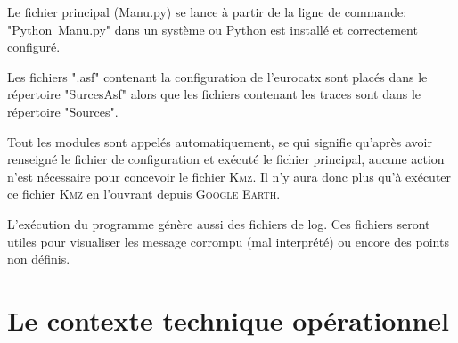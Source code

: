 Le fichier principal (Manu.py) se lance à partir de la ligne de commande: "Python~Manu.py" dans un système ou Python est installé et correctement configuré.

Les fichiers ".asf" contenant la configuration de l’eurocatx sont placés dans le répertoire "SurcesAsf" alors que les fichiers contenant les traces sont dans le répertoire "Sources". 

Tout les modules sont appelés automatiquement, se qui signifie qu'après avoir renseigné le fichier de configuration et exécuté le fichier principal, aucune action n'est nécessaire pour concevoir le fichier \textsc{Kmz}. Il n'y aura donc plus qu'à exécuter ce fichier \textsc{Kmz} en l'ouvrant depuis \textsc{Google Earth}. 

L'exécution du programme génère aussi des fichiers de log. Ces fichiers seront utiles pour visualiser les message corrompu (mal interprété) ou encore des points non définis.

\section{Le contexte technique opérationnel}

